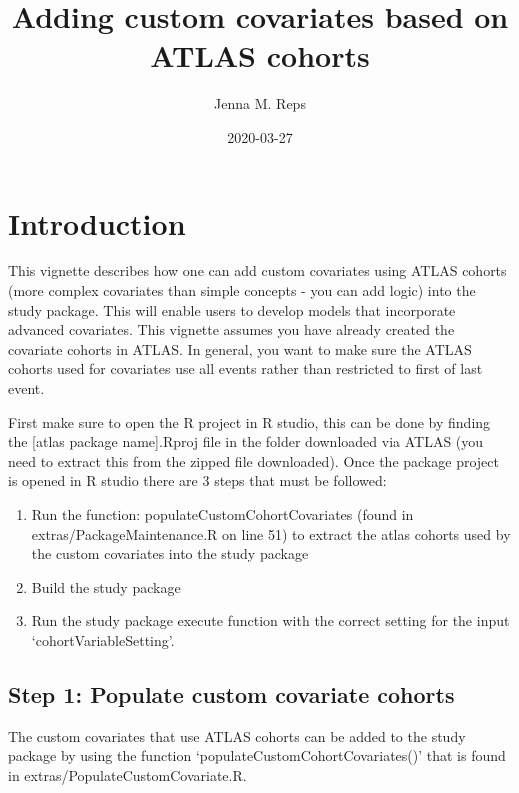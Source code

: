 \documentclass[
]{article}
\title{Adding custom covariates based on ATLAS cohorts}
\author{Jenna M. Reps}
\date{2020-03-27}
\providecommand{\tightlist}{%
  \setlength{\itemsep}{0pt}\setlength{\parskip}{0pt}}
\begin{document}
\maketitle

{
\setcounter{tocdepth}{2}
\tableofcontents
}
\hypertarget{introduction}{%
\section{Introduction}\label{introduction}}

This vignette describes how one can add custom covariates using ATLAS
cohorts (more complex covariates than simple concepts - you can add
logic) into the study package. This will enable users to develop models
that incorporate advanced covariates. This vignette assumes you have
already created the covariate cohorts in ATLAS. In general, you want to
make sure the ATLAS cohorts used for covariates use all events rather
than restricted to first of last event.

First make sure to open the R project in R studio, this can be done by
finding the {[}atlas package name{]}.Rproj file in the folder downloaded
via ATLAS (you need to extract this from the zipped file downloaded).
Once the package project is opened in R studio there are 3 steps that
must be followed:

\begin{enumerate}
\def\labelenumi{\arabic{enumi}.}
\tightlist
\item
  Run the function: populateCustomCohortCovariates (found in
  extras/PackageMaintenance.R on line 51) to extract the atlas cohorts
  used by the custom covariates into the study package
\item
  Build the study package
\item
  Run the study package execute function with the correct setting for
  the input `cohortVariableSetting'.
\end{enumerate}

\hypertarget{step-1-populate-custom-covariate-cohorts}{%
\subsection{Step 1: Populate custom covariate
cohorts}\label{step-1-populate-custom-covariate-cohorts}}

The custom covariates that use ATLAS cohorts can be added to the study
package by using the function `populateCustomCohortCovariates()' that is
found in extras/PopulateCustomCovariate.R.
\end{document}

